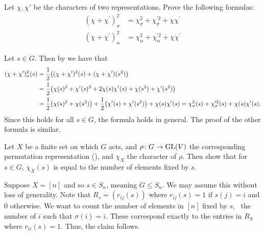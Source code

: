 \documentclass[letterpaper, 11pt, oneside]{book}
\begin{document}
\begin{exercise}
  Let $\chi, \chi'$ be the characters of two representations.
  Prove the following formulas:
  \begin{align*}
    (\chi + \chi^{\prime})^{2}_{\sigma} &= \chi_{\sigma}^{2} + \chi_{\sigma}^{\prime 2} + \chi \chi^{\prime} \\
    (\chi + \chi^{\prime})^{2}_{\alpha} &= \chi_{\alpha}^{2} + \chi_{\alpha}^{\prime 2} + \chi \chi^{\prime}
  \end{align*}
\end{exercise}
\begin{pf}
  Let $s \in G$.
  Then by  we have that
  \begin{align*}
    (\chi + \chi^{\prime})^{2}_{\sigma}(s) &= \frac{1}{2}\pqty{(\chi + \chi^{\prime})^{2}(s) + (\chi + \chi^{\prime})(s^{2})} \\
                                           &= \frac{1}{2}\pqty{\chi(s)^{2} + \chi'(s)^{2} + 2\chi(s)\chi'(s) + \chi(s^{2}) + \chi'(s^{2})} \\
                                           &= \frac{1}{2}\pqty{\chi(s)^{2} + \chi(s^{2})} + \frac{1}{2}\pqty{\chi'(s) + \chi'(s^{2})} + \chi(s)\chi'(s) = \chi^{2}_{\sigma}(s) + \chi^{\prime 2}_{\sigma}(s) + \chi(s) \chi'(s).
  \end{align*}
  Since this holds for all $s \in G$, the formula holds in general.
  The proof of the other formula is similar.
\end{pf}

\begin{exercise}
  Let $X$ be a finite set on which $G$ acts, and $\rho\colon G \to \operatorname{GL}(V)$ the corresponding permutation representation (), and $\chi_{X}$ the character of $\rho$.
  Then show that for $s \in G$, $\chi_{X}(s)$ is equal to the number of elements fixed by $s$.
\end{exercise}
\begin{pf}
  Suppose $X = [n]$ and so $s \in S_{n}$, meaning $G \leq S_{n}$.
  We may assume this without loss of generality.
  Note that $R_{s} = (r_{ij}(s))$ where $r_{ij}(s) = 1$ if $s(j) = i$ and $0$ otherwise.
  We want to count the number of elements in $[n]$ fixed by $s$, \ie\ the number of $i$ such that $\sigma(i) = i$.
  These correspond exactly to the entries in $R_{S}$ where $r_{ii}(s) = 1$.
  Thus, the claim follows.
\end{pf}

\printbibliography
\end{document}
